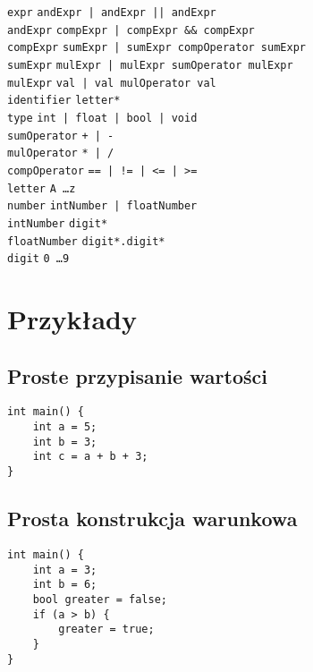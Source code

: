 \documentclass{article}
\newcommand{\keyword}[1]{\colorbox{light-gray}{\texttt{#1}}}
\newcommand{\code}[1]{\texttt{#1}}
\begin{document}
\code{expr} \textrightarrow \code{andExpr | andExpr \keyword{||} andExpr} \\
\code{andExpr} \textrightarrow \code{compExpr | compExpr \keyword{\&\&} compExpr} \\
\code{compExpr} \textrightarrow \code{sumExpr | sumExpr compOperator sumExpr} \\
\code{sumExpr} \textrightarrow \code{mulExpr | mulExpr sumOperator mulExpr} \\
\code{mulExpr} \textrightarrow \code{val | val mulOperator val} \\

\code{identifier} \textrightarrow \code{letter*} \\
\code{type} \textrightarrow \code{\keyword{int} | \keyword{float} | \keyword{bool} | \keyword{void}} \\
\code{sumOperator} \textrightarrow \code{\keyword{+} | \keyword{-}} \\
\code{mulOperator} \textrightarrow \code{\keyword{*} | \keyword{/}} \\
\code{compOperator} \textrightarrow \code{\keyword{==} | \keyword{!=} | \keyword{<=} | \keyword{>=}} \\
\code{letter} \textrightarrow \code{\keyword{A} \ldots \keyword{z}} \\
\code{number} \textrightarrow \code{intNumber | floatNumber} \\
\code{intNumber} \textrightarrow \code{digit*} \\
\code{floatNumber} \textrightarrow \code{digit*.digit*} \\
\code{digit} \textrightarrow \code{\keyword{0} \ldots \keyword{9}} \\
\newpage

\section{Przykłady}
\subsection{Proste przypisanie wartości}
\begin{lstlisting}[tabsize=2]
int main() {
	int a = 5;
	int b = 3;
	int c = a + b + 3;
}
\end{lstlisting}

\subsection{Prosta konstrukcja warunkowa}
\begin{lstlisting}[tabsize=2]
int main() {
	int a = 3;
	int b = 6;
	bool greater = false;
	if (a > b) {
		greater = true;
	}
}
\end{lstlisting}
\end{document}
